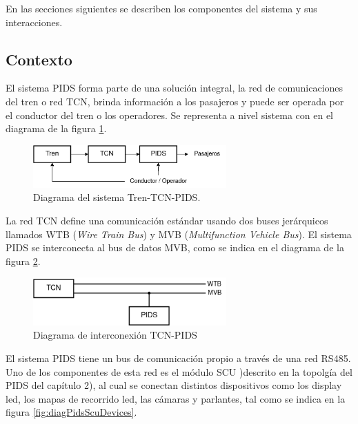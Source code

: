 En las secciones siguientes se describen los componentes del sistema y sus interacciones. \

\subsection{Contexto}

El sistema PIDS forma parte de una solución integral, la red de comunicaciones del tren o red TCN, brinda información a los pasajeros y puede ser operada por el conductor del tren o los operadores. Se representa a nivel sistema con en el diagrama de la figura \ref{fig:diagTrenTcnPids}.\\

\begin{figure}[ht]
	\centering
	\includegraphics[width=0.66\textwidth]{./Figures/diagTrenTcnPids.png}
	\caption{Diagrama del sistema Tren-TCN-PIDS.}
	\label{fig:diagTrenTcnPids}
\end{figure}

La red TCN define una comunicación estándar usando dos buses jerárquicos llamados WTB (\textit{Wire Train Bus}) y MVB (\textit{Multifunction Vehicle Bus}). El sistema PIDS se interconecta al bus de datos MVB, como se indica en el diagrama de la figura \ref{fig:diagTcnPidsBuusesWtbMvb}.\\


\begin{figure}[ht]
	\centering
	\includegraphics[width=0.66\textwidth]{./Figures/diagTcnPidsBusesWtbMvb.png}
	\caption{Diagrama de interconexión TCN-PIDS}
	\label{fig:diagTcnPidsBuusesWtbMvb}
\end{figure}

El sistema PIDS tiene un bus de comunicación propio a través de una red RS485. Uno de los componentes de esta red es el módulo SCU )descrito en la topolgía del PIDS del capítulo 2), al cual se conectan distintos dispositivos como los display led, los mapas de recorrido led, las cámaras y parlantes, tal como se indica en la figura 	\ref{fig:diagPidsScuDevices}.\\


